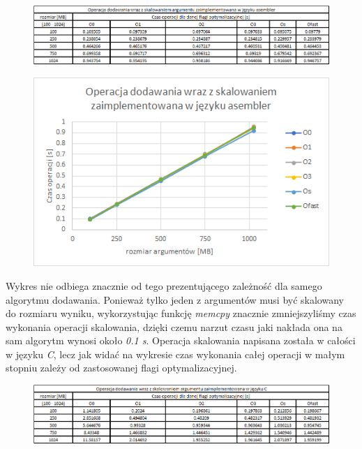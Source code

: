\documentclass{article}
\begin{document}
\newpage{}

\begin{figure}[h!]

\includegraphics[scale=0.65]{charts/add_scale_asm.png}

\end{figure}

\begin{figure}[h!]
\centering
\includegraphics[scale=0.75]{charts/add_scale_asm_p.png}

\end{figure}

\vspace{5mm}

Wykres nie odbiega znacznie od tego prezentującego zależność dla samego algorytmu dodawania. Ponieważ tylko jeden z argumentów musi być skalowany do rozmiaru wyniku, wykorzystując funkcję \textit{memcpy} znacznie zmniejszyliśmy czas wykonania operacji skalowania, dzięki czemu narzut czasu jaki nakłada ona na sam algorytm wynosi około \textit{0.1 s}. Operacja skalowania napisana została w całości w języku \textit{C}, lecz jak widać na wykresie czas wykonania całej operacji w małym stopniu zależy od zastosowanej flagi optymalizacyjnej.

\newpage{}

\begin{figure}[h!]

\includegraphics[scale=0.65]{charts/add_scale_c.png}

\end{figure}
\end{document}
